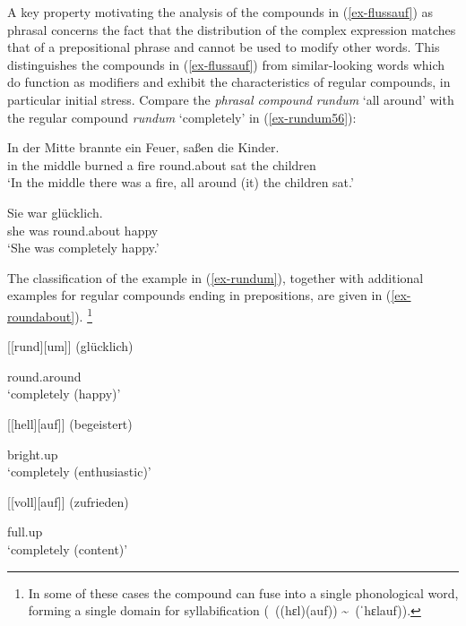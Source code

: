 \documentclass[output=paper
 ,nobabel
 ,draftmode
 ,colorlinks, citecolor=brown
]{langscibook}
\begin{document}
A key property motivating the analysis of the compounds in (\ref{ex-flussauf}) as phrasal concerns the fact that the distribution of the complex expression matches that of a prepositional phrase and cannot be used to modify other words. This distinguishes the compounds in (\ref{ex-flussauf}) from similar-looking words which do function as modifiers and exhibit the characteristics of regular compounds, in particular initial stress. Compare the \emph{phrasal compound} \emph{rundum} `all around' with the regular compound \emph{rundum} `completely' in (\ref{ex-rundum56}):

\eal\label{ex-rundum56}
\ex
\gll In der Mitte brannte ein Feuer,  saßen die Kinder. \\
     in the middle burned a   fire   round.about            sat   the children\\
\glt `In the middle there was a fire, all around (it) the children sat.'

\ex\label{ex-rundum}
\gll Sie war  glücklich. \\
     she was round.about             happy\\
\glt `She was completely happy.'
\zl

\largerpage
\noindent
The classification of the example in (\ref{ex-rundum}), together with additional examples for regular compounds ending in prepositions, are given in (\ref{ex-roundabout}).%
%
\footnote{In some of these cases the compound can fuse into a single phonological word, forming a single domain for syllabification (\eg\ ((hɛl)(auf)) \textasciitilde\ (ˈhɛlauf)).}

\settowidth{}
\ea\label{ex-roundabout}
\ea {}[[rund][um]] (glücklich) 

round.around\\
`completely (happy)'


\ex {}[[hell][auf]] (begeistert) 

bright.up\\
`completely (enthusiastic)'


\ex {}[[voll][auf]] (zufrieden) 

full.up\\
`completely (content)'
\end{document}
